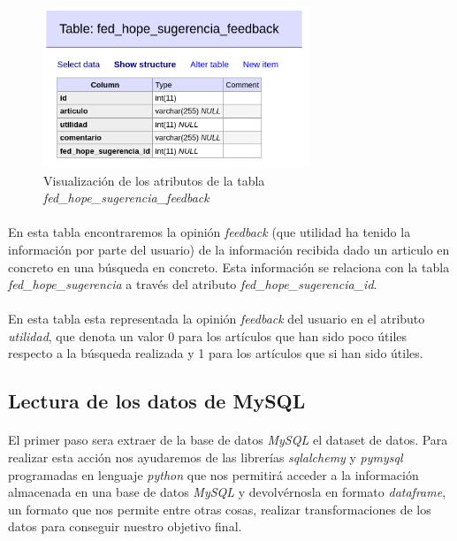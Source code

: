 \documentclass[10pt,a4paper,oneside]{book}
\begin{document}
\paragraph{}
\begin{figure}[!htb]
  \centering
  \includegraphics[width=8cm]{images/metodologia_tabla_fed_hope_sugerencia_feedback.png}
  \caption{Visualización de los atributos de la tabla \textit{fed\_hope\_sugerencia\_feedback}}
\end{figure}

\paragraph{}
En esta tabla encontraremos la opinión \textit{feedback} (que utilidad ha tenido la información por parte del usuario) de la información recibida dado un articulo en concreto en una búsqueda en concreto. Esta información se relaciona con la tabla \textit{fed\_hope\_sugerencia} a través del atributo \textit{fed\_hope\_sugerencia\_id}.

\paragraph{}
En esta tabla esta representada la opinión \textit{feedback} del usuario en el atributo \textit{utilidad}, que denota un valor 0 para los artículos que han sido poco útiles respecto a la búsqueda realizada y 1 para los artículos que si han sido útiles.

\newpage
\subsection{Lectura de los datos de MySQL}

\paragraph{}
El primer paso sera extraer de la base de datos \textit{MySQL} el dataset de datos. Para realizar esta acción nos ayudaremos de las librerías \textit{sqlalchemy} y \textit{pymysql} programadas en lenguaje \textit{python} que nos permitirá acceder a la información almacenada en una base de datos \textit{MySQL} y devolvérnosla en formato \textit{dataframe}, un formato que nos permite entre otras cosas, realizar transformaciones de los datos para conseguir nuestro objetivo final.
\end{document}
